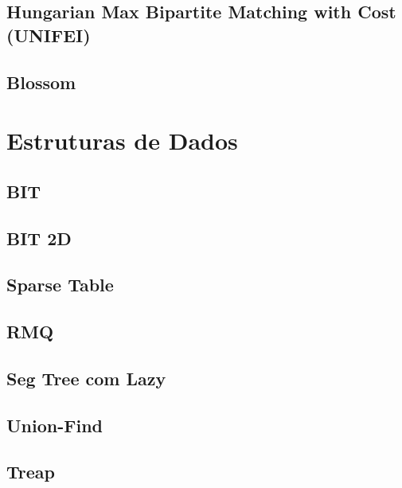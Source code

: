\subsection{Hungarian Max Bipartite Matching with Cost (UNIFEI)}
\raggedbottom
\hrulefill
\subsection{Blossom}
\raggedbottom
\hrulefill

\section{Estruturas de Dados}
\subsection{BIT}
\raggedbottom
\hrulefill
\subsection{BIT 2D}
\raggedbottom
\hrulefill
\subsection{Sparse Table}
\raggedbottom
\hrulefill
\subsection{RMQ}
\raggedbottom
\hrulefill
\subsection{Seg Tree com Lazy}
\raggedbottom
\hrulefill
\subsection{Union-Find}
\raggedbottom
\hrulefill
\subsection{Treap}
\raggedbottom
\hrulefill
